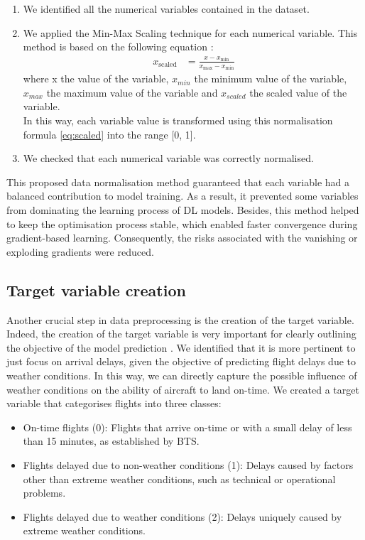 \documentclass[12pt,oneside]{book} %
\begin{document}
\begin{enumerate}
    \item We identified all the numerical variables contained in the dataset.
    \item We applied the Min-Max \cite{MinMax} Scaling technique for each numerical variable. This method is based on the following equation \cite{MinMax}:
    \begin{align}
        x_{\text{scaled}} &= \frac{x - x_{\text{min}}}{x_{\text{max}} - x_{\text{min}}} \label{eq:scaled}
    \end{align}
where x the value of the variable, \(x_{min}\) the minimum value of the variable, \(x_{max}\) the maximum value of the variable and \(x_{scaled}\) the scaled value of the variable.\\

In this way, each variable value is transformed using this normalisation formula \ref{eq:scaled} into the range [0, 1].
    \item We checked that each numerical variable was correctly normalised.
\end{enumerate}

\noindent This proposed data normalisation method guaranteed that each variable had a balanced contribution to model training. As a result, it prevented some variables from dominating the learning process of DL models. Besides, this method helped to keep the optimisation process stable, which enabled faster convergence during gradient-based learning. Consequently, the risks associated with the vanishing or exploding gradients were reduced.

\subsection{Target variable creation}
\label{target_variable}

\noindent Another crucial step in data preprocessing is the creation of the target variable. Indeed, the creation of the target variable is very important for clearly outlining the objective of the model prediction \cite{TargetVariable}. We identified that it is more pertinent to just focus on arrival delays, given the objective of predicting flight delays due to weather conditions. In this way, we can directly capture the possible influence of weather conditions on the ability of aircraft to land on-time. We created a target variable that categorises flights into three classes:
\begin{itemize}
    \item On-time flights (0): Flights that arrive on-time or with a small delay of less than 15 minutes, as established by BTS. 
    \item Flights delayed due to non-weather conditions (1): Delays caused by factors other than extreme weather conditions, such as technical or operational problems. 
    \item Flights delayed due to weather conditions (2): Delays uniquely caused by extreme weather conditions.
\end{itemize}
\end{document}
